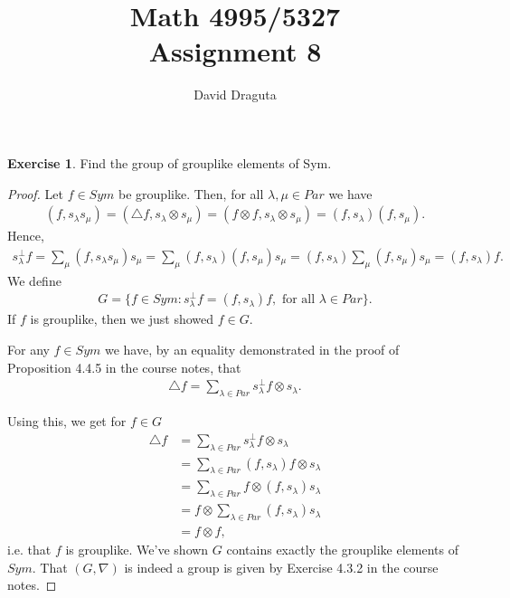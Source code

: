 \documentclass[12pt]{extarticle}
\title{ Math 4995/5327
  \\
  Assignment 8}
\author{David Draguta}
\newcommand{\set}[1]{\{#1\}}
\newcommand{\<}{\langle}
\renewcommand{\>}{\rangle}
\theoremstyle{definition}
\newtheorem{exercise}{Exercise}
\begin{document}
\maketitle

\begin{exercise}
  Find the group of grouplike elements of Sym.
\end{exercise}
\begin{proof}
  Let $f \in Sym$ be grouplike. Then, for all $\lambda, \mu \in Par$ we have
  \begin{align*}
    (f, s_{\lambda} s_{\mu}) = (\triangle f, s_{\lambda} \otimes s_{\mu}) = (f \otimes f, s_{\lambda} \otimes s_{\mu}) = (f, s_{\lambda})(f, s_\mu).
  \end{align*}
  Hence,
  \begin{align*}
    s_{\lambda}^{\perp} f = \sum\limits_{\mu} (f, s_\lambda s_\mu) s_{\mu} =  \sum\limits_{\mu} (f, s_{\lambda})(f, s_\mu)s_{\mu} =  (f, s_{\lambda})\sum\limits_{\mu}(f, s_\mu)s_{\mu} = (f,s_\lambda)f.
  \end{align*}
  We define
  \begin{align*}
    G = \set{f \in Sym: s_\lambda^{\perp} f = (f,s_\lambda)f, \text{ for all } \lambda \in Par}.
  \end{align*}
  If $f$ is grouplike, then we just showed $f \in G$.

  For any $f \in Sym$ we have, by an equality demonstrated in the proof of Proposition 4.4.5 in the course notes, that
  \begin{align*}
    \triangle f = \sum\limits_{\lambda \in Par} s_\lambda^{\perp}f \otimes s_{\lambda}.
  \end{align*}

  Using this, we get for $f \in G$
  \begin{align*}
    \triangle f
    &= 
    \sum\limits_{\lambda \in Par} s_\lambda^{\perp}f \otimes s_{\lambda} \\
    &=  \sum\limits_{\lambda \in Par} (f,s_\lambda)f \otimes s_{\lambda} \\
    &=  \sum\limits_{\lambda \in Par} f \otimes (f,s_\lambda)s_{\lambda} \\
    &= f \otimes \sum\limits_{\lambda \in Par}(f,s_\lambda)s_{\lambda} \\
    &=
    f \otimes f,
  \end{align*}
  i.e. that $f$ is grouplike. We've shown $G$ contains exactly the grouplike elements of $Sym$. That $(G, \nabla)$ is indeed a group is given by Exercise 4.3.2 in the course notes.
\end{proof}
\end{document}
